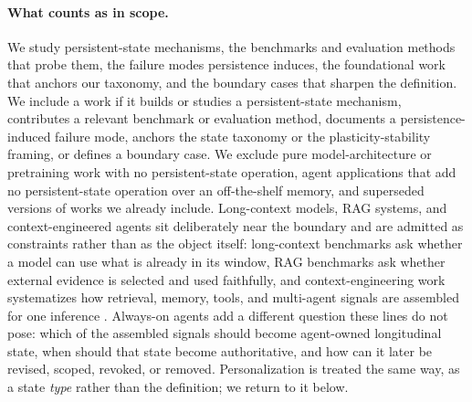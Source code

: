 \paragraph{What counts as in scope.} We study persistent-state mechanisms, the benchmarks and evaluation methods that probe them, the failure modes persistence induces, the foundational work that anchors our taxonomy, and the boundary cases that sharpen the definition. We include a work if it builds or studies a persistent-state mechanism, contributes a relevant benchmark or evaluation method, documents a persistence-induced failure mode, anchors the state taxonomy or the plasticity-stability framing, or defines a boundary case. We exclude pure model-architecture or pretraining work with no persistent-state operation, agent applications that add no persistent-state operation over an off-the-shelf memory, and superseded versions of works we already include. Long-context models, RAG systems, and context-engineered agents sit deliberately near the boundary and are admitted as constraints rather than as the object itself: long-context benchmarks ask whether a model can use what is already in its window, RAG benchmarks ask whether external evidence is selected and used faithfully, and context-engineering work systematizes how retrieval, memory, tools, and multi-agent signals are assembled for one inference \citep{mei2025surveycontextengineering}. Always-on agents add a different question these lines do not pose: which of the assembled signals should become agent-owned longitudinal state, when should that state become authoritative, and how can it later be revised, scoped, revoked, or removed. Personalization is treated the same way, as a state \emph{type} rather than the definition; we return to it below.

